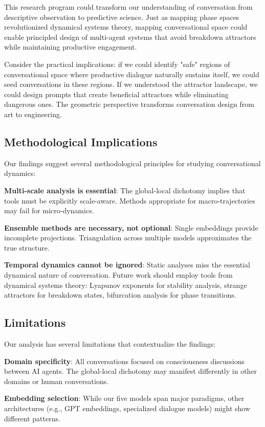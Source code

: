 \documentclass[11pt,letterpaper]{article}
\begin{document}
This research program could transform our understanding of conversation from descriptive observation to predictive science. Just as mapping phase spaces revolutionized dynamical systems theory, mapping conversational space could enable principled design of multi-agent systems that avoid breakdown attractors while maintaining productive engagement.

Consider the practical implications: if we could identify "safe" regions of conversational space where productive dialogue naturally sustains itself, we could seed conversations in these regions. If we understood the attractor landscape, we could design prompts that create beneficial attractors while eliminating dangerous ones. The geometric perspective transforms conversation design from art to engineering.

\subsection{Methodological Implications}

Our findings suggest several methodological principles for studying conversational dynamics:

\textbf{Multi-scale analysis is essential}: The global-local dichotomy implies that tools must be explicitly scale-aware. Methods appropriate for macro-trajectories may fail for micro-dynamics.

\textbf{Ensemble methods are necessary, not optional}: Single embeddings provide incomplete projections. Triangulation across multiple models approximates the true structure.

\textbf{Temporal dynamics cannot be ignored}: Static analyses miss the essential dynamical nature of conversation. Future work should employ tools from dynamical systems theory: Lyapunov exponents for stability analysis, strange attractors for breakdown states, bifurcation analysis for phase transitions.

\subsection{Limitations}

Our analysis has several limitations that contextualize the findings:

\textbf{Domain specificity}: All conversations focused on consciousness discussions between AI agents. The global-local dichotomy may manifest differently in other domains or human conversations.

\textbf{Embedding selection}: While our five models span major paradigms, other architectures (e.g., GPT embeddings, specialized dialogue models) might show different patterns.
\end{document}
